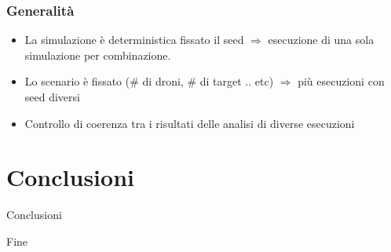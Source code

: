 \documentclass{beamer}
\begin{document}
\begin{frame}
\frametitle{Generalit\`a}
\begin{itemize}
  \item La simulazione \`e deterministica fissato il seed $\Rightarrow$ esecuzione di una sola simulazione per combinazione.
  \item Lo scenario \`e fissato (\# di droni, \# di target .. etc) $\Rightarrow$ pi\`u esecuzioni con seed diversi
  \item Controllo di coerenza tra i risultati delle analisi di diverse esecuzioni
\end{itemize}
\end{frame}

\section{Conclusioni}

\begin{frame}
\centering
\Huge
Conclusioni
\end{frame}

\begin{frame}
\centering
\Huge
Fine
\end{frame}
\end{document}
